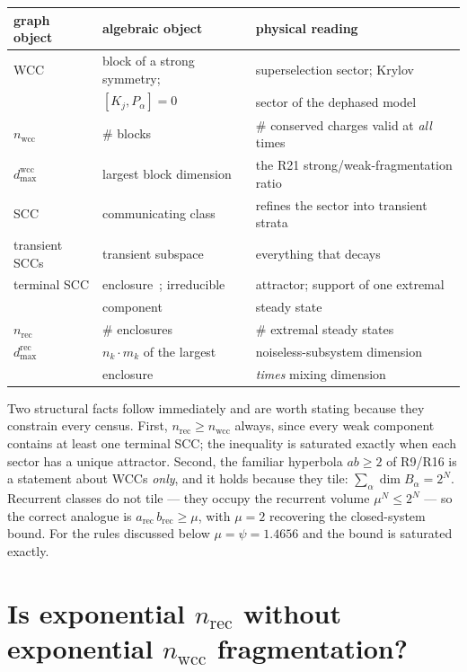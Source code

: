 \documentclass[11pt]{article}
\theoremstyle{plain}
\theoremstyle{definition}
\theoremstyle{remark}
\begin{document}
\begin{center}
\small
\begin{tabular}{@{}lll@{}}
\toprule
graph object & algebraic object & physical reading \\
\midrule
WCC & block of a strong symmetry; & superselection sector; Krylov \\
    & $[K_j,P_\alpha]=0$ & sector of the dephased model \\[2pt]
$n_{\mathrm{wcc}}$ & \# blocks & \# conserved charges valid at \emph{all} times \\[2pt]
$d^{\mathrm{wcc}}_{\max}$ & largest block dimension & the R21 strong/weak-fragmentation ratio \\[4pt]
SCC & communicating class & refines the sector into transient strata \\[2pt]
transient SCCs & transient subspace & everything that decays \\[4pt]
terminal SCC & enclosure~\cite{bn2008}; irreducible & attractor; support of one extremal \\
    & component~\cite{carbone2016} & steady state \\[2pt]
$n_{\mathrm{rec}}$ & \# enclosures & \# extremal steady states \\[2pt]
$d^{\mathrm{rec}}_{\max}$ & $n_k \cdot m_k$ of the largest & noiseless-subsystem dimension \\
    & enclosure & \emph{times} mixing dimension \\
\bottomrule
\end{tabular}
\end{center}

Two structural facts follow immediately and are worth stating because they
constrain every census. First, $n_{\mathrm{rec}} \ge n_{\mathrm{wcc}}$ always,
since every weak component contains at least one terminal SCC; the inequality
is saturated exactly when each sector has a unique attractor. Second, the
familiar hyperbola $ab \ge 2$ of R9/R16 is a statement about WCCs \emph{only},
and it holds because they tile: $\sum_\alpha \dim B_\alpha = 2^N$. Recurrent
classes do not tile --- they occupy the recurrent volume $\mu^N \le 2^N$ ---
so the correct analogue is $a_{\mathrm{rec}} \, b_{\mathrm{rec}} \ge \mu$, with
$\mu = 2$ recovering the closed-system bound. For the rules discussed below
$\mu = \psi = 1.4656$ and the bound is saturated exactly.

\section{Is exponential \texorpdfstring{$n_{\mathrm{rec}}$}{n\_rec} without
exponential \texorpdfstring{$n_{\mathrm{wcc}}$}{n\_wcc} fragmentation?}
\label{sec:answer}
\end{document}
